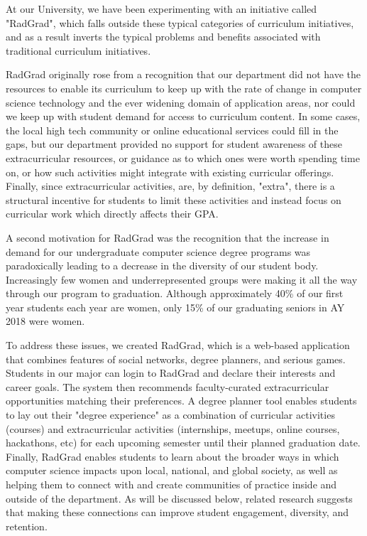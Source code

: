 \documentclass[acmsmall]{acmart}
\begin{document}
At our University, we have been experimenting with an initiative called "RadGrad", which falls outside these typical categories of curriculum initiatives, and as a result inverts the typical problems and benefits associated with traditional curriculum initiatives.

RadGrad originally rose from a recognition that our department did not have the resources to enable its curriculum to keep up with the rate of change in computer science technology and the ever widening domain of application areas, nor could we keep up with student demand for access to curriculum content.  In some cases, the local high tech community or online educational services could fill in the gaps, but our department provided no support for student awareness of these extracurricular resources, or guidance as to which ones were worth spending time on, or how such activities might integrate with existing curricular offerings.  Finally, since extracurricular activities, are, by definition, "extra", there is a structural incentive for students to limit these activities and instead focus on curricular work which directly affects their GPA.

A second motivation for RadGrad was the recognition that the increase in demand for our undergraduate computer science degree programs was paradoxically leading to a decrease in the diversity of our student body. Increasingly few women and underrepresented groups were making it all the way through our program to graduation. Although approximately 40\% of our first year students each year are women, only 15\% of our graduating seniors in AY 2018 were women.

To address these issues, we created RadGrad, which is a web-based application that combines features of social networks, degree planners, and serious games.  Students in our major can login to RadGrad and declare their interests and career goals. The system then recommends faculty-curated extracurricular opportunities matching their preferences. A degree planner tool enables students to lay out their "degree experience" as a combination of curricular activities (courses) and extracurricular activities (internships, meetups, online courses, hackathons, etc) for each upcoming semester until their planned graduation date. Finally, RadGrad enables students to learn about the broader ways in which computer science impacts upon local, national, and global society, as well as helping them to connect with and create communities of practice inside and outside of the department. As will be discussed below, related research suggests that making these connections can improve student engagement, diversity, and retention.
\end{document}
